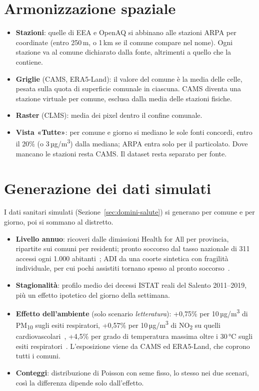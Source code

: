 \section{Armonizzazione spaziale}
\label{sec:dati-armonizzazione}

\begin{itemize}
  \item \textbf{Stazioni}: quelle di EEA e OpenAQ si abbinano alle stazioni ARPA per coordinate (entro 250\,m, o 1\,km se il comune compare nel nome). Ogni stazione va al comune dichiarato dalla fonte, altrimenti a quello che la contiene.
  \item \textbf{Griglie} (CAMS, ERA5-Land): il valore del comune è la media delle celle, pesata sulla quota di superficie comunale in ciascuna. CAMS diventa una stazione virtuale per comune, esclusa dalla media delle stazioni fisiche.
  \item \textbf{Raster} (CLMS): media dei pixel dentro il confine comunale.
  \item \textbf{Vista «Tutte»}: per comune e giorno si mediano le sole fonti concordi, entro il 20\% (o 3\,µg/m\textsuperscript{3}) dalla mediana; ARPA entra solo per il particolato. Dove mancano le stazioni resta CAMS. Il dataset resta separato per fonte.
\end{itemize}

\section{Generazione dei dati simulati}
\label{sec:dati-simulazione}

I dati sanitari simulati (Sezione~\ref{sec:domini-salute}) si generano per comune e per giorno, poi si sommano al distretto.
\begin{itemize}
  \item \textbf{Livello annuo}: ricoveri dalle dimissioni Health for All per provincia, ripartite sui comuni per residenti; pronto soccorso dal tasso nazionale di 311 accessi ogni 1.000 abitanti~\cite{qs_annuario_ssn_2023}; ADI da una coorte sintetica con fragilità individuale, per cui pochi assistiti tornano spesso al pronto soccorso~\cite{campagna_adi_ps_2021}.
  \item \textbf{Stagionalità}: profilo medio dei decessi ISTAT reali del Salento 2011--2019, più un effetto ipotetico del giorno della settimana.
  \item \textbf{Effetto dell'ambiente} (solo scenario \emph{letteratura}): +0,75\% per 10\,µg/m\textsuperscript{3} di PM\textsubscript{10} sugli esiti respiratori, +0,57\% per 10\,µg/m\textsuperscript{3} di NO\textsubscript{2} su quelli cardiovascolari~\cite{scarinzi_epiair2_2013}, +4,5\% per grado di temperatura massima oltre i 30\,°C sugli esiti respiratori~\cite{michelozzi_phewe_2009}. L'esposizione viene da CAMS ed ERA5-Land, che coprono tutti i comuni.
  \item \textbf{Conteggi}: distribuzione di Poisson con seme fisso, lo stesso nei due scenari, così la differenza dipende solo dall'effetto.
\end{itemize}

